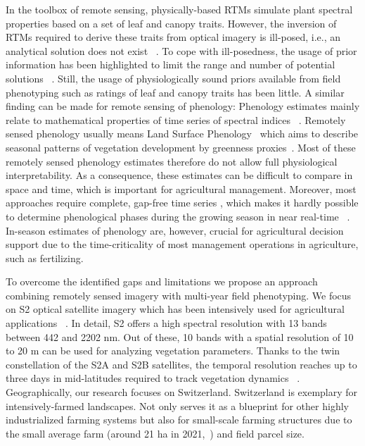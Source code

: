 In the toolbox of remote sensing, physically-based \gls{RTM}s simulate plant spectral properties based on a set of leaf and canopy traits. However, the inversion of \gls{RTM}s required to derive these traits from optical imagery is ill-posed, i.e., an analytical solution does not exist ~\citep{combal_retrieval_2002,atzberger_object-based_2004}. To cope with ill-posedness, the usage of prior information has been highlighted to limit the range and number of potential solutions ~\citep[for example]{lauvernet_multitemporal-patch_2008}. Still, the usage of physiologically sound priors available from field phenotyping such as ratings of leaf and canopy traits has been little. A similar finding can be made for remote sensing of phenology: Phenology estimates mainly relate to mathematical properties of time series of spectral indices ~\citep{de_beurs_land_2004,garonna_variability_2016,peng_scaling_2017,bolton_continental-scale_2020}. Remotely sensed phenology usually means Land Surface Phenology~\citep{de_beurs_land_2004} which aims to describe seasonal patterns of vegetation development by greenness proxies~\citep{helman_land_2018}. Most of these remotely sensed phenology estimates therefore do not allow full physiological interpretability. As a consequence, these estimates can be difficult to compare in space and time, which is important for agricultural management. Moreover, most approaches require complete, gap-free time series \citep[for instance]{lobert_deep_2023}, which makes it hardly possible to determine phenological phases during the growing season in near real-time ~\citep{liao_near_2023}. In-season estimates of phenology are, however, crucial for agricultural decision support due to the time-criticality of most management operations in agriculture, such as fertilizing.

To overcome the identified gaps and limitations we propose an approach combining remotely sensed imagery with multi-year field phenotyping. We focus on \gls{S2} optical satellite imagery which has been intensively used for agricultural applications ~\citep{delloye_retrieval_2018,meroni_comparing_2021,chen_improving_2022}. In detail, \gls{S2} offers a high spectral resolution with 13 bands between 442 and 2202 nm. Out of these, 10 bands with a spatial resolution of 10 to 20 m can be used for analyzing vegetation parameters. Thanks to the twin constellation of the S2A and S2B satellites, the temporal resolution reaches up to three days in mid-latitudes required to track vegetation dynamics ~\citep{frampton_evaluating_2013}. Geographically, our research focuses on Switzerland. Switzerland is exemplary for intensively-farmed landscapes. Not only serves it as a blueprint for other highly industrialized farming systems but also for small-scale farming structures due to the small average farm (around 21 ha in 2021,~\citep{federal_statistical_office_landwirtschaft_2022}) and field parcel size. 

